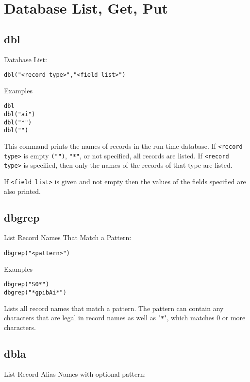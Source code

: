 \section{Database List, Get, Put}

\subsection{dbl}

Database List:

\begin{verbatim}
dbl("<record type>","<field list>")
\end{verbatim}

Examples

\begin{verbatim}
dbl
dbl("ai")
dbl("*")
dbl("")

\end{verbatim}

This command prints the names of records in the run time database. If \verb|<record type>| is empty \verb|("")|, \verb|"*"|, or not 
specified, all records are listed. If \verb|<record type>| is specified, then only the names of the records of that type are 
listed.

If \verb|<field list>| is given and not empty then the values of the fields specified are also printed.

\subsection{dbgrep}

List Record Names That Match a Pattern:

\begin{verbatim}
dbgrep("<pattern>")
\end{verbatim}

Examples

\begin{verbatim}
dbgrep("S0*")
dbgrep("*gpibAi*")
\end{verbatim}

Lists all record names that match a pattern. The pattern can contain any characters that are legal in record names as well as 
"\verb|*|", which matches 0 or more characters.

\subsection{dbla}

List Record Alias Names with optional pattern:

